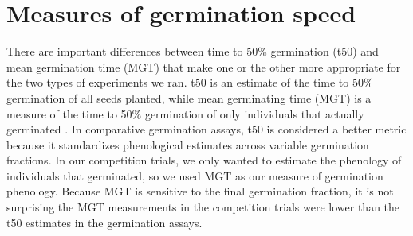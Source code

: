 \documentclass{article}
\begin{document}
\pagebreak
\section*{Measures of germination speed}
There are important differences between time to 50\% germination (t50) and mean germination time (MGT) that make one or the other more appropriate for the two types of experiments we ran. t50 is an estimate of the time to 50\% germination of all seeds planted, while mean germinating time (MGT) is a measure of the time to 50\% germination of only individuals that actually germinated \citep{Soltani:2015aa}. In comparative germination assays, t50 is considered a better metric because it standardizes phenological estimates across variable germination fractions. In our competition trials, we only wanted to estimate the phenology of individuals that germinated, so we used MGT as our measure of germination phenology. Because MGT is sensitive to the final germination fraction, it is not surprising the MGT measurements in the competition trials  were lower than the t50 estimates in the germination assays.


\end{document}
